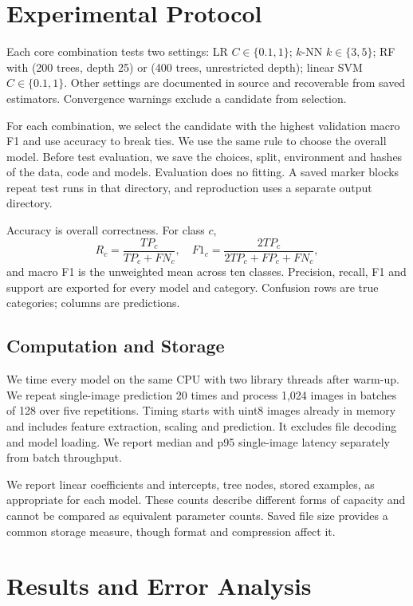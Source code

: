\documentclass[conference]{IEEEtran}
\begin{document}
\section{Experimental Protocol}
Each core combination tests two settings: LR $C\in\{0.1,1\}$; $k$-NN $k\in\{3,5\}$; RF with (200 trees, depth 25) or (400 trees, unrestricted depth); linear SVM $C\in\{0.1,1\}$. Other settings are documented in source and recoverable from saved estimators. Convergence warnings exclude a candidate from selection.

For each combination, we select the candidate with the highest validation macro F1 and use accuracy to break ties. We use the same rule to choose the overall model. Before test evaluation, we save the choices, split, environment and hashes of the data, code and models. Evaluation does no fitting. A saved marker blocks repeat test runs in that directory, and reproduction uses a separate output directory.

Accuracy is overall correctness. For class $c$,
\[R_c=\frac{TP_c}{TP_c+FN_c},\quad
F1_c=\frac{2TP_c}{2TP_c+FP_c+FN_c},\]
and macro F1 is the unweighted mean across ten classes. Precision, recall, F1 and support are exported for every model and category. Confusion rows are true categories; columns are predictions.

\subsection{Computation and Storage}
We time every model on the same CPU with two library threads after warm-up. We repeat single-image prediction 20 times and process 1,024 images in batches of 128 over five repetitions. Timing starts with uint8 images already in memory and includes feature extraction, scaling and prediction. It excludes file decoding and model loading. We report median and p95 single-image latency separately from batch throughput.

We report linear coefficients and intercepts, tree nodes, stored examples, as appropriate for each model. These counts describe different forms of capacity and cannot be compared as equivalent parameter counts. Saved file size provides a common storage measure, though format and compression affect it.

\section{Results and Error Analysis}

\end{document}

